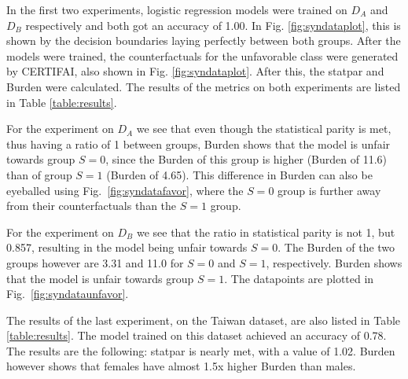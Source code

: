\documentclass[runningheads]{llncs}
\begin{document}
In the first two experiments, logistic regression models were trained on $D_A$ and $D_B$ respectively and both got an accuracy of 1.00. In Fig. \ref{fig:syndataplot}, this is shown by the decision boundaries laying perfectly between both groups. After the models were trained, the counterfactuals for the unfavorable class were generated by CERTIFAI, also shown in Fig. \ref{fig:syndataplot}. After this, the \gls{statpar} and \gls{Burden} were calculated. The results of the metrics on both experiments are listed in Table \ref{table:results}.

For the experiment on $D_A$ we see that even though the statistical parity is met, thus having a ratio of 1 between groups, Burden shows that the model is unfair towards group $S=0$, since the Burden of this group is higher (Burden of 11.6) than of group $S=1$ (Burden of 4.65). This difference in Burden can also be eyeballed using Fig.~\ref{fig:syndatafavor}, where the $S=0$ group is further away from their counterfactuals than the $S=1$ group.

For the experiment on $D_B$ we see that the ratio in statistical parity is not 1, but 0.857, resulting in the model being unfair towards $S=0$. The Burden of the two groups however are 3.31 and 11.0 for $S=0$ and $S=1$, respectively. Burden shows that the model is unfair towards group $S=1$. The datapoints are plotted in Fig.~\ref{fig:syndataunfavor}.

The results of the last experiment, on the Taiwan dataset, are also listed in Table \ref{table:results}. The model trained on this dataset achieved an accuracy of 0.78. The results are the following: \Gls{statpar} is nearly met, with a value of 1.02. \Gls{Burden} however shows that females have almost 1.5x higher Burden than males.
\end{document}

